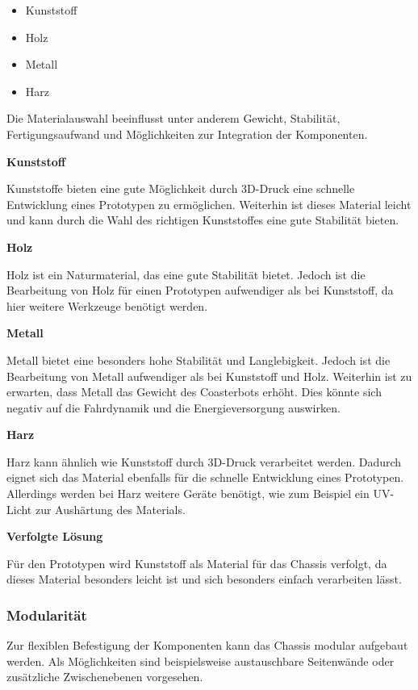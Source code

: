 \documentclass[
  a4paper,
  12pt,
  DIV=12,        %
  parskip=half,  %
  headings=small %
]{scrartcl}
\theoremstyle{definition}
\providecommand{\tightlist}{%
  \setlength{\itemsep}{0pt}\setlength{\parskip}{0pt}}
\theoremstyle{definition}
\begin{document}
\begin{itemize}
\tightlist
\item
  Kunststoff
\item
  Holz
\item
  Metall
\item
  Harz
\end{itemize}

Die Materialauswahl beeinflusst unter anderem Gewicht, Stabilität,
Fertigungsaufwand und Möglichkeiten zur Integration der Komponenten.

\textbf{Kunststoff}

Kunststoffe bieten eine gute Möglichkeit durch 3D-Druck eine 
schnelle Entwicklung eines Prototypen zu ermöglichen.
Weiterhin ist dieses Material leicht und kann durch die Wahl 
des richtigen Kunststoffes eine gute Stabilität bieten.

\textbf{Holz}

Holz ist ein Naturmaterial, das eine gute Stabilität bietet. 
Jedoch ist die Bearbeitung von Holz für einen Prototypen aufwendiger als bei Kunststoff, 
da hier weitere Werkzeuge benötigt werden.

\textbf{Metall}

Metall bietet eine besonders hohe Stabilität und Langlebigkeit. 
Jedoch ist die Bearbeitung von Metall aufwendiger als bei Kunststoff und Holz.
Weiterhin ist zu erwarten, dass Metall das Gewicht des Coasterbots erhöht.
Dies könnte sich negativ auf die Fahrdynamik und die Energieversorgung auswirken.

\textbf{Harz}

Harz kann ähnlich wie Kunststoff durch 3D-Druck verarbeitet werden.
Dadurch eignet sich das Material ebenfalls für die schnelle Entwicklung eines Prototypen.
Allerdings werden bei Harz weitere Geräte benötigt, wie zum Beispiel ein UV-Licht zur Aushärtung des Materials.

\textbf{Verfolgte Lösung}

Für den Prototypen wird Kunststoff als Material für das Chassis verfolgt, da dieses Material
besonders leicht ist und sich besonders einfach verarbeiten lässt.

\subsubsection{Modularität}\label{modularituxe4t}

Zur flexiblen Befestigung der Komponenten kann das Chassis modular
aufgebaut werden. Als Möglichkeiten sind beispielsweise austauschbare
Seitenwände oder zusätzliche Zwischenebenen vorgesehen.
\end{document}
